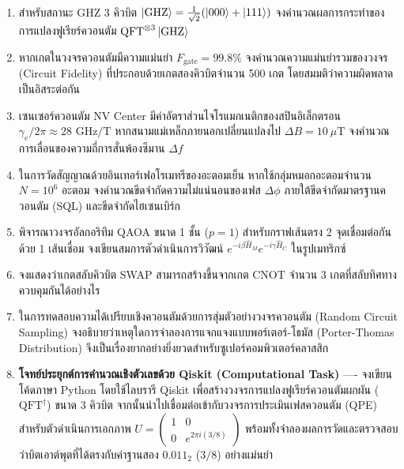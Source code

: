 \begin{enumerate}[label=\textbf{\arabic*.}]
    \item สำหรับสถานะ GHZ 3 คิวบิต $\ket{\text{GHZ}} = \frac{1}{\sqrt{2}}(\ket{000}+\ket{111})$ จงคำนวณผลการกระทำของการแปลงฟูเรียร์ควอนตัม $\text{QFT}^{\otimes 3} \ket{\text{GHZ}}$
    \item หากเกตในวงจรควอนตัมมีความแม่นยำ $F_{\text{gate}} = 99.8\%$ จงคำนวณความแม่นยำรวมของวงจร (Circuit Fidelity) ที่ประกอบด้วยเกตสองคิวบิตจำนวน 500 เกต โดยสมมติว่าความผิดพลาดเป็นอิสระต่อกัน
    \item เซนเซอร์ควอนตัม NV Center มีค่าอัตราส่วนไจโรแมกเนติกของสปินอิเล็กตรอน $\gamma_e / 2\pi \approx 28\text{ GHz/T}$ หากสนามแม่เหล็กภายนอกเปลี่ยนแปลงไป $\Delta B = 10\ \mu\text{T}$ จงคำนวณการเลื่อนของความถี่การสั่นพ้องซีมาน $\Delta f$
    \item ในการวัดสัญญาณด้วยอินเทอร์เฟอโรเมทรีของอะตอมเย็น หากใช้กลุ่มหมอกอะตอมจำนวน $N = 10^6$ อะตอม จงคำนวณขีดจำกัดความไม่แน่นอนของเฟส $\Delta \phi$ ภายใต้ขีดจำกัดมาตรฐานควอนตัม (SQL) และขีดจำกัดไฮเซนเบิร์ก
    \item พิจารณาวงจรอัลกอริทึม QAOA ขนาด 1 ชั้น ($p=1$) สำหรับกราฟเส้นตรง 2 จุดเชื่อมต่อกันด้วย 1 เส้นเชื่อม จงเขียนสมการตัวดำเนินการวิวัฒน์ $e^{-i\beta \hat{H}_M} e^{-i\gamma \hat{H}_C}$ ในรูปเมทริกซ์
    \item จงแสดงว่าเกตสลับคิวบิต SWAP สามารถสร้างขึ้นจากเกต CNOT จำนวน 3 เกตที่สลับทิศทางควบคุมกันได้อย่างไร
    \item ในการทดสอบความได้เปรียบเชิงควอนตัมด้วยการสุ่มตัวอย่างวงจรควอนตัม (Random Circuit Sampling) จงอธิบายว่าเหตุใดการจำลองการแจกแจงแบบพอร์เตอร์-โธมัส (Porter-Thomas Distribution) จึงเป็นเรื่องยากอย่างยิ่งยวดสำหรับซูเปอร์คอมพิวเตอร์คลาสสิก
    \item \textbf{โจทย์ประยุกต์การคำนวณเชิงตัวเลขด้วย Qiskit (Computational Task)} ---- จงเขียนโค้ดภาษา Python โดยใช้ไลบรารี Qiskit เพื่อสร้างวงจรการแปลงฟูเรียร์ควอนตัมผกผัน ($\text{QFT}^\dagger$) ขนาด 3 คิวบิต จากนั้นนำไปเชื่อมต่อเข้ากับวงจรการประเมินเฟสควอนตัม (QPE) สำหรับตัวดำเนินการเอกภาพ $U = \begin{pmatrix} 1 & 0 \\ 0 & e^{2\pi i (3/8)} \end{pmatrix}$ พร้อมทั้งจำลองผลการวัดและตรวจสอบว่าบิตเอาต์พุตที่ได้ตรงกับค่าฐานสอง $0.011_2$ ($3/8$) อย่างแม่นยำ
\end{enumerate}

